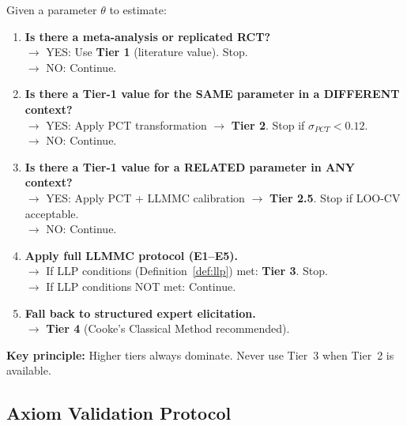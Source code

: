 \begin{tcolorbox}[colback=yellow!5!white, colframe=orange!75!black,
    title=\textbf{BBB Tier Selection: Decision Tree}]

Given a parameter $\theta$ to estimate:

\begin{enumerate}
    \item \textbf{Is there a meta-analysis or replicated RCT?} \\
    $\to$ YES: Use \textbf{Tier 1} (literature value). Stop. \\
    $\to$ NO: Continue.

    \item \textbf{Is there a Tier-1 value for the SAME parameter in a DIFFERENT context?} \\
    $\to$ YES: Apply PCT transformation $\to$ \textbf{Tier 2}. Stop if $\sigma_{PCT} < 0.12$. \\
    $\to$ NO: Continue.

    \item \textbf{Is there a Tier-1 value for a RELATED parameter in ANY context?} \\
    $\to$ YES: Apply PCT + LLMMC calibration $\to$ \textbf{Tier 2.5}.
    Stop if LOO-CV acceptable. \\
    $\to$ NO: Continue.

    \item \textbf{Apply full LLMMC protocol (E1--E5).} \\
    $\to$ If LLP conditions (Definition~\ref{def:llp}) met: \textbf{Tier 3}. Stop. \\
    $\to$ If LLP conditions NOT met: Continue.

    \item \textbf{Fall back to structured expert elicitation.} \\
    $\to$ \textbf{Tier 4} (Cooke's Classical Method recommended).
\end{enumerate}

\textbf{Key principle:} Higher tiers always dominate. Never use Tier~3 when Tier~2 is available.

\end{tcolorbox}


\subsection{Axiom Validation Protocol}
\label{sec:AN-axiom-validation}


